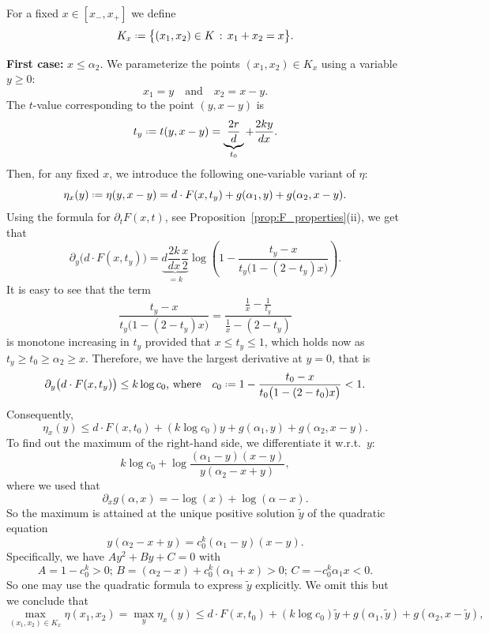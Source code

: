 \documentclass[12pt]{amsart}
\theoremstyle{definition}
\newcommand\yt{\widetilde{y}}
\newcommand\al{\alpha}
\newcommand{\defeq}{\mathrel{\vcenter{\baselineskip0.5ex \lineskiplimit0pt
                     \hbox{\scriptsize.}\hbox{\scriptsize.}}}%
                     =}
\begin{document}
For a fixed $x \in [x_-,x_+]$ we define 
%
\[ K_x \defeq \big\{ (x_1,x_2)\in K \, : \, x_1+x_2=x \big\} .\]

\medskip

\noindent\textbf{First case:} $x \leq \al_2$. 
We parameterize the points $(x_1,x_2) \in K_x$ using a variable $y \geq 0$:
%
\[ x_1=y 
\quad \text{and} \quad 
x_2=x-y .
\]
%
The $t$-value corresponding to the point $(y,x-y)$ is
%
\[ t_y \defeq t(y,x-y) = 
\underbrace{\frac{2r}{d}}_{t_0} + \frac{2k y}{dx} .\]
%
Then, for any fixed $x$, we introduce the following one-variable variant of $\eta$:
%
%
\begin{equation} \label{eq:eta_x}
\eta_x(y) \defeq \eta(y,x-y) = 
d \cdot F(x,t_y )+g(\al_1,y)+g(\al_2,x-y) .
\end{equation}
%
Using the formula for $\partial_t F (x,t)$, see Proposition~\ref{prop:F_properties}(ii), we get that 
%
\[ \partial_y \big( d \cdot F(x,t_y) \big) = 
\underbrace{d \frac{2k}{dx} \frac{x}{2}}_{=k} 
\log \left( 1- \frac{t_y-x}{t_y \big( 1-(2-t_y)x \big)} \right). \]
%
It is easy to see that the term 
%
\[ \frac{t_y-x}{t_y \big( 1-(2-t_y)x \big)} 
= \frac{\frac1x-\frac1{t_y}}{\frac1x-(2-t_y)} \]
%
is monotone increasing in $t_y$ provided that $x \leq t_y \leq 1$, which holds now as $t_y \geq t_0 \geq \al_2 \geq x$. Therefore, we have the largest derivative at $y=0$, that is 
%
\[ \partial_y \big( d \cdot F(x,t_y) \big) 
\leq k \log c_0 
\text{, where} \quad 
c_0 \defeq 1-\frac{t_0-x}{t_0 \big( 1-(2-t_0)x \big)} < 1 .\]
%
Consequently, 
%
\[ \eta_x(y) \leq d \cdot F(x,t_0) + 
(k \log c_0 ) y + g(\al_1,y) + g(\al_2,x-y) .\]
%
To find out the maximum of the right-hand side, we differentiate it w.r.t.~$y$: 
%
\[ k \log c_0 
+ \log \frac{(\al_1-y)(x-y)}{y(\al_2-x+y)} ,\]
%
where we used that 
%
\[ \partial_x g(\al,x)= -\log(x) + \log(\al-x) .\]
%
So the maximum is attained at the unique positive solution $\yt$ of the quadratic equation 
%
\begin{equation} \label{eq:quadratic}
y(\al_2-x+y) = c_0^k (\al_1-y)(x-y) .
\end{equation}
%
Specifically, we have $Ay^2+By+C=0$ with 
%
\[ A=1-c_0^k > 0; \, 
B=(\al_2-x)+c_0^k (\al_1+x)>0; \, 
C=  - c_0^k \al_1 x < 0 .\]
%
So one may use the quadratic formula to express $\yt$ explicitly. We omit this but we conclude that  
%
\begin{equation} \label{eq:bound_with_yt}
\max_{(x_1,x_2) \in K_x} \eta(x_1,x_2) 
= \max_{y} \eta_x(y) \leq d \cdot F(x,t_0) + 
(k \log c_0 ) \yt + g(\al_1,\yt) + g(\al_2,x-\yt) ,
\end{equation}
\end{document}
